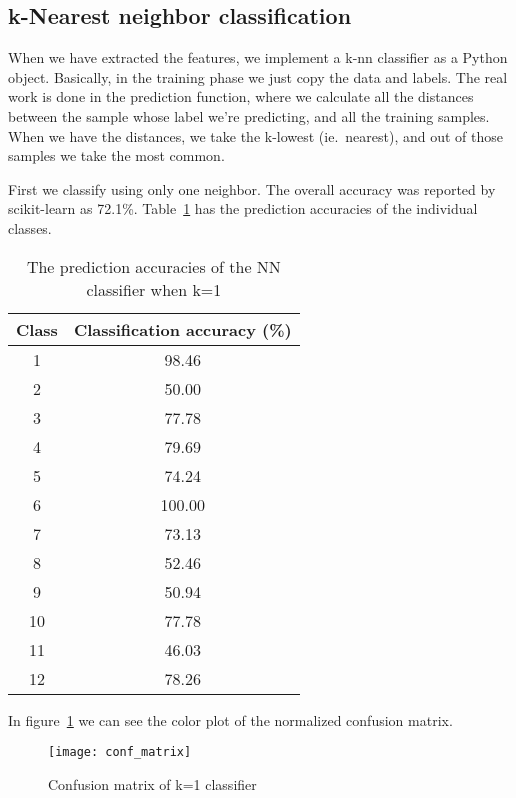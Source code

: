 \subsection{k-Nearest neighbor classification}

When we have extracted the features, we implement a k-nn classifier as a Python
object. Basically, in the training phase we just copy the data and labels. The
real work is done in the prediction function, where we calculate all the
distances between the sample whose label we're predicting, and all the training
samples. When we have the distances, we take the k-lowest (ie.\ nearest), and
out of those samples we take the most common.

First we classify using only one neighbor. The overall accuracy was reported by
scikit-learn as 72.1\%.
Table~\ref{tab:accuracy_k1} has the prediction accuracies of the individual
classes.
\begin{table}
  \centering
  \caption{The prediction accuracies of the NN classifier when k=1}
  \begin{tabular}{cc}  
    \toprule
    \cmidrule(r){1-2}
    Class    & Classification accuracy (\%) \\
    \midrule

    1	& 98.46  \\
    2	& 50.00  \\
    3	& 77.78  \\
    4	& 79.69  \\
    5	& 74.24  \\
    6	& 100.00  \\
    7	& 73.13  \\
    8	& 52.46  \\
    9	& 50.94  \\
    10	& 77.78  \\
    11	& 46.03  \\
    12	& 78.26  \\

    \bottomrule
  \end{tabular}
\label{tab:accuracy_k1}
\end{table}


In figure~\ref{fig:conf_mat} we can see the color plot
of the normalized confusion matrix.
\begin{figure}[h]
  \centering
  \texttt{[image: conf\_matrix]}
  \caption{Confusion matrix of k=1 classifier}
\label{fig:conf_mat}
\end{figure}


